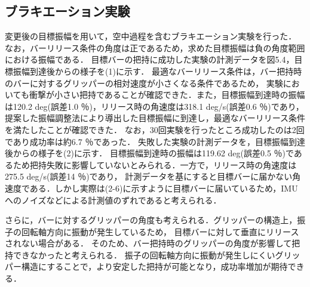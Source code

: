           \subsection{ブラキエーション実験}
          変更後の目標振幅を用いて，空中過程を含むブラキエーション実験を行った．
          なお，バーリリース条件の角度は正であるため，求めた目標振幅は負の角度範囲における振幅である．
          目標バーの把持に成功した実験の計測データを図5.4，目標振幅到達後からの様子を(1)に示す．
          最適なバーリリース条件は，バー把持時のバーに対するグリッパーの相対速度が小さくなる条件であるため，
          実験においても衝撃が小さい把持であることが確認できた．また，目標振幅到達時の振幅は120.2 deg(誤差1.0 ％)，リリース時の角速度は318.1 deg/s(誤差0.6 ％)であり，
          提案した振幅調整法により導出した目標振幅に到達し，最適なバーリリース条件を満たしたことが確認できた．
          なお，30回実験を行ったところ成功したのは2回であり成功率は約6.7 ％であった．
          失敗した実験の計測データを，目標振幅到達後からの様子を(2)に示す．
          目標振幅到達時の振幅は119.62 deg(誤差0.5 ％)であるため把持失敗に影響していないとみられる．一方で，リリース時の角速度は275.5 deg/s(誤差14 ％)であり，
          計測データを基にすると目標バーに届かない角速度である．しかし実際は(2-6)に示すように目標バーに届いているため，IMUへのノイズなどによる計測値のずれであると考えられる．
          
          さらに，バーに対するグリッパーの角度も考えられる．グリッパーの構造上，振子の回転軸方向に振動が発生しているため，
          目標バーに対して垂直にリリースされない場合がある．
          そのため、バー把持時のグリッパーの角度が影響して把持できなかったと考えられる．
          振子の回転軸方向に振動が発生しにくいグリッパー構造にすることで，より安定した把持が可能となり，成功率増加が期待できる．
          
